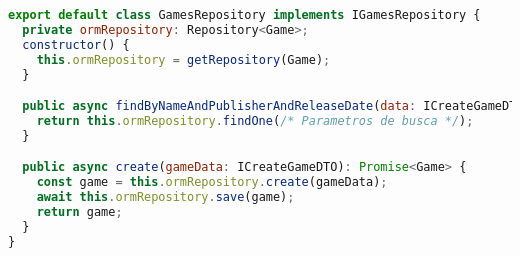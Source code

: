 \begin{lstlisting}[language=JavaScript, caption={O Adaptador de Interface do Banco de Dados},captionpos=b, label=alg:gamerepository]
export default class GamesRepository implements IGamesRepository {
  private ormRepository: Repository<Game>;
  constructor() {
    this.ormRepository = getRepository(Game);
  }

  public async findByNameAndPublisherAndReleaseDate(data: ICreateGameDTO): Promise<Game | undefined> {
    return this.ormRepository.findOne(/* Parametros de busca */);
  }

  public async create(gameData: ICreateGameDTO): Promise<Game> {
    const game = this.ormRepository.create(gameData);
    await this.ormRepository.save(game);
    return game;
  }
}

\end{lstlisting}